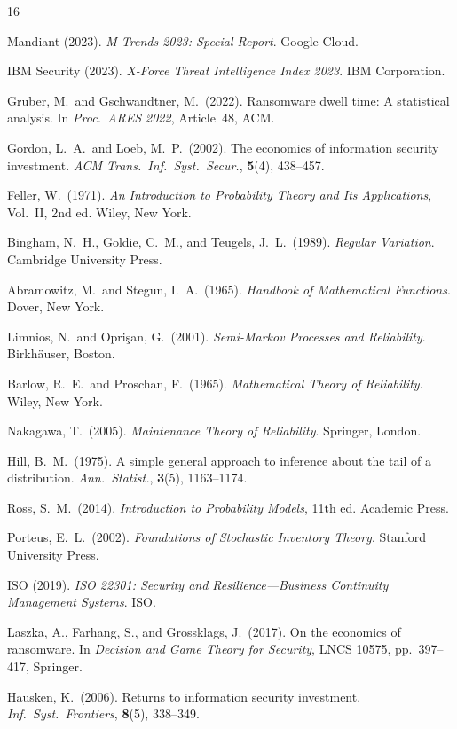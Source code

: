 \documentclass[12pt,a4paper]{article}
\theoremstyle{plain}
\theoremstyle{definition}
\theoremstyle{remark}
\begin{document}
\begin{thebibliography}{16}

Mandiant (2023). \textit{M-Trends 2023: Special Report}. Google Cloud.

IBM Security (2023). \textit{X-Force Threat Intelligence Index 2023}. IBM Corporation.

Gruber, M.\ and Gschwandtner, M.\ (2022).
Ransomware dwell time: A statistical analysis.
In \textit{Proc.\ ARES 2022}, Article~48, ACM.

Gordon, L.\ A.\ and Loeb, M.\ P.\ (2002).
The economics of information security investment.
\textit{ACM Trans.\ Inf.\ Syst.\ Secur.}, \textbf{5}(4), 438--457.

Feller, W.\ (1971).
\textit{An Introduction to Probability Theory and Its Applications},
Vol.~II, 2nd ed. Wiley, New York.

Bingham, N.\ H., Goldie, C.\ M., and Teugels, J.\ L.\ (1989).
\textit{Regular Variation}. Cambridge University Press.

Abramowitz, M.\ and Stegun, I.\ A.\ (1965).
\textit{Handbook of Mathematical Functions}. Dover, New York.

Limnios, N.\ and Opri\c{s}an, G.\ (2001).
\textit{Semi-Markov Processes and Reliability}. Birkh\"{a}user, Boston.

Barlow, R.\ E.\ and Proschan, F.\ (1965).
\textit{Mathematical Theory of Reliability}. Wiley, New York.

Nakagawa, T.\ (2005).
\textit{Maintenance Theory of Reliability}. Springer, London.

Hill, B.\ M.\ (1975).
A simple general approach to inference about the tail of a distribution.
\textit{Ann.\ Statist.}, \textbf{3}(5), 1163--1174.

Ross, S.\ M.\ (2014).
\textit{Introduction to Probability Models}, 11th ed. Academic Press.

Porteus, E.\ L.\ (2002).
\textit{Foundations of Stochastic Inventory Theory}. Stanford University Press.

ISO (2019). \textit{ISO 22301: Security and Resilience---Business Continuity
Management Systems}. ISO.

Laszka, A., Farhang, S., and Grossklags, J.\ (2017).
On the economics of ransomware.
In \textit{Decision and Game Theory for Security},
LNCS 10575, pp.~397--417, Springer.

Hausken, K.\ (2006).
Returns to information security investment.
\textit{Inf.\ Syst.\ Frontiers}, \textbf{8}(5), 338--349.

\end{thebibliography}
\end{document}
